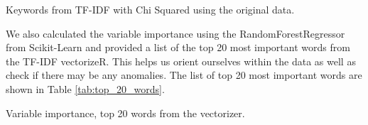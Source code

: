 \begin{table}[!ht]
\centering
\caption{Keywords from TF-IDF with Chi Squared using the original data.}

\label{tab:correlated_unigrams_original}
\end{table}


We also calculated the variable importance using the RandomForestRegressor from Scikit-Learn and provided a list of the top 20 most important words from the TF-IDF vectorizeR. This helps us orient ourselves within the data as well as check if there may be any anomalies. The list of top 20 most important words are shown in Table \ref{tab:top_20_words}.


\begin{table}[!ht]
\centering
\caption{Variable importance, top 20 words from the vectorizer.}

\label{tab:top_20_words}
\end{table}



